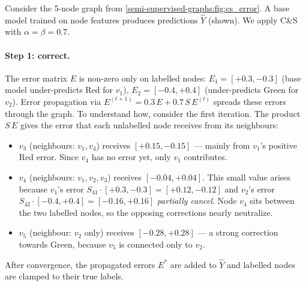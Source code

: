 \begin{notechapter}
Consider the 5-node graph from \cref{semi-supervised-graphs:fig:cs_error}. A base model
trained on node features produces predictions $\hat{Y}$ (shown). We apply
C\&S with $\alpha = \beta = 0.7$.
\vspace{0.5em}

\paragraph{Step 1: correct.} The error matrix $E$ is non-zero only on labelled
nodes: $E_1 = [+0.3, -0.3]$ (base model under-predicts Red for $v_1$),
$E_2 = [-0.4, +0.4]$ (under-predicts Green for $v_2$). Error propagation
via $E^{(t+1)} = 0.3\,E + 0.7\,S\,E^{(t)}$ spreads these errors through
the graph. To understand how, consider the first iteration. The product
$S\,E$ gives the error that each unlabelled node receives from its neighbours:
\begin{itemize}
    \item $v_3$ (neighbours: $v_1, v_4$) receives $[+0.15, -0.15]$ --- mainly
          from $v_1$'s positive Red error. Since $v_4$ has no error yet,
          only $v_1$ contributes.
    \item $v_4$ (neighbours: $v_1, v_2, v_3$) receives $[{-0.04}, {+0.04}]$.
          This small value arises because $v_1$'s error
          $S_{41}\!\cdot\![+0.3,-0.3] = [+0.12, -0.12]$ and $v_2$'s error
          $S_{42}\!\cdot\![-0.4,+0.4] = [-0.16, +0.16]$ \emph{partially
          cancel}. Node $v_4$ sits between the two labelled nodes, so the
          opposing corrections nearly neutralize.
    \item $v_5$ (neighbour: $v_2$ only) receives $[-0.28, +0.28]$ --- a strong
          correction towards Green, because $v_5$ is connected only to $v_2$.
\end{itemize}
After convergence, the propagated errors $E^*$ are added to $\hat{Y}$
and labelled nodes are clamped to their true labels.
\vspace{0.5em}


\end{notechapter}
